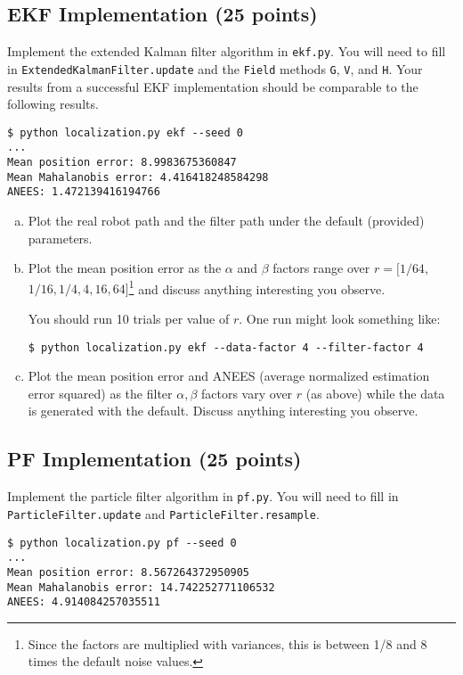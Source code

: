 \documentclass{article}
\newcommand{\?}{\stackrel{?}{=}}
\begin{document}
\clearpage

\subsection{EKF Implementation (25 points)}

Implement the extended Kalman filter algorithm in \texttt{ekf.py}.
You will need to fill in \verb|ExtendedKalmanFilter.update| and the \verb|Field| methods \verb|G|, \verb|V|, and \verb|H|.
Your results from a successful EKF implementation should be comparable to the following results.
\begin{verbatim}
$ python localization.py ekf --seed 0
...
Mean position error: 8.9983675360847
Mean Mahalanobis error: 4.416418248584298
ANEES: 1.472139416194766
\end{verbatim}

\begin{enumerate}[(a)]
\item Plot the real robot path and the filter path under the default (provided)
  parameters.
\item Plot the mean position error as the $\alpha$ and $\beta$ factors
  range over $r = [1/64,$ $1/16, 1/4, 4, 16, 64]$\footnote{
  Since the factors are multiplied with variances, this is between 1/8 and 8 times the default noise values.}
  and discuss anything interesting you observe.

  You should run 10 trials per value of $r$. One run might look something like:
\begin{verbatim}$ python localization.py ekf --data-factor 4 --filter-factor 4\end{verbatim}
\item Plot the mean position error and ANEES (average normalized estimation error squared)
  as the filter $\alpha, \beta$ factors vary over $r$ (as above) while the data is generated with the
  default. Discuss anything interesting you observe.
\end{enumerate}

\subsection{PF Implementation (25 points)}

Implement the particle filter algorithm in \texttt{pf.py}.
You will need to fill in \verb|ParticleFilter.update| and \verb|ParticleFilter.resample|.
\begin{verbatim}
$ python localization.py pf --seed 0
...
Mean position error: 8.567264372950905
Mean Mahalanobis error: 14.742252771106532
ANEES: 4.914084257035511
\end{verbatim}
\end{document}
